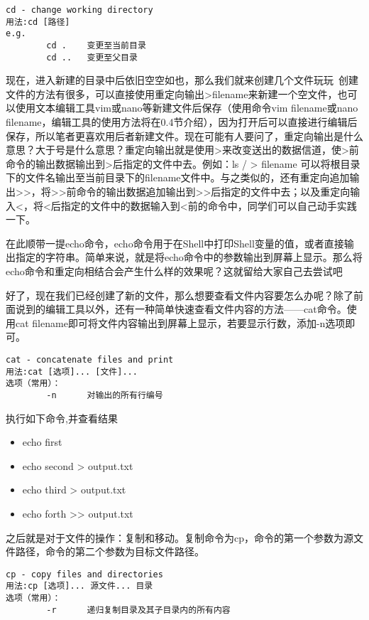 \begin{verbatim}
cd - change working directory
用法:cd [路径]
e.g.
		cd .	变更至当前目录
		cd ..	变更至父目录
\end{verbatim}

现在，进入新建的目录中后依旧空空如也，那么我们就来创建几个文件玩玩~创建文件的方法有很多，可以直接使用重定向输出>filename来新建一个空文件，也可以使用文本编辑工具vim或nano等新建文件后保存（使用命令vim filename或nano filename，编辑工具的使用方法将在0.4节介绍），因为打开后可以直接进行编辑后保存，所以笔者更喜欢用后者新建文件。现在可能有人要问了，重定向输出是什么意思？大于号是什么意思？重定向输出就是使用>来改变送出的数据信道，使>前命令的输出数据输出到>后指定的文件中去。例如：ls / > filename 可以将根目录下的文件名输出至当前目录下的filename文件中。与之类似的，还有重定向追加输出>>，将>>前命令的输出数据追加输出到>>后指定的文件中去；以及重定向输入<，将<后指定的文件中的数据输入到<前的命令中，同学们可以自己动手实践一下。

在此顺带一提echo命令，echo命令用于在Shell中打印Shell变量的值，或者直接输出指定的字符串。简单来说，就是将echo命令中的参数输出到屏幕上显示。那么将echo命令和重定向相结合会产生什么样的效果呢？这就留给大家自己去尝试吧~

好了，现在我们已经创建了新的文件，那么想要查看文件内容要怎么办呢？除了前面说到的编辑工具以外，还有一种简单快速查看文件内容的方法——cat命令。使用cat filename即可将文件内容输出到屏幕上显示，若要显示行数，添加-n选项即可。

\begin{verbatim}
cat - concatenate files and print
用法:cat [选项]... [文件]...
选项（常用）：
		-n		对输出的所有行编号
\end{verbatim}

\begin{exercise}
	执行如下命令,并查看结果
	\begin{itemize}
		\item echo first
		\item echo second > output.txt
		\item echo third > output.txt
		\item echo forth >> output.txt
	\end{itemize}
\end{exercise}
之后就是对于文件的操作：复制和移动。复制命令为cp，命令的第一个参数为源文件路径，命令的第二个参数为目标文件路径。

\begin{verbatim}
cp - copy files and directories
用法:cp [选项]... 源文件... 目录
选项（常用）：
		-r		递归复制目录及其子目录内的所有内容
\end{verbatim}

